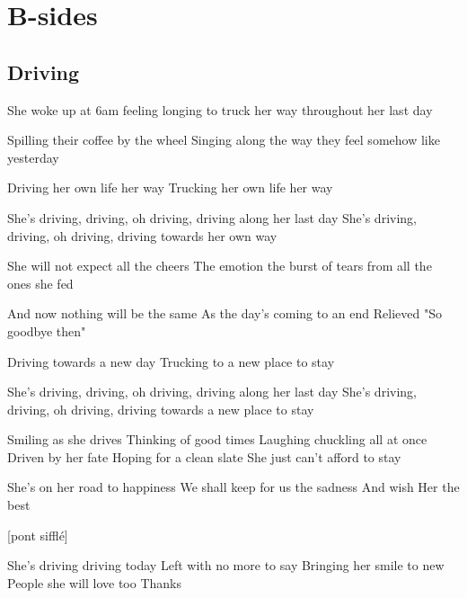 \documentclass{article}
\newenvironment{album}[1]%
{%
  \section*{#1}
}%
{%
}
\newenvironment{song}[1]%
{%
  \subsection*{\textbf{#1}}
  \begin{multicols*}{2}
}%
{%
  \end{multicols*}
  \newpage
}
\newenvironment{couplet} %
{%
  \verbatim
}%
{% end code
  \endverbatim
}
\newenvironment{refrain} %
{%
  \verbatim
}%
{% end code
  \endverbatim
}
\newenvironment{prerefrain} %
{%
  \verbatim
}%
{% end code
  \endverbatim
}
\newenvironment{pont} %
{%
  \verbatim
}%
{% end code
  \endverbatim
}
\begin{document}
\begin{album}{B-sides}
\begin{song}{Driving}
\begin{couplet}
She woke up at 6am
feeling longing to truck her way 
throughout 
her last day
\end{couplet}
\begin{couplet}
Spilling their coffee by the wheel
Singing along the way they feel
somehow 
like yesterday
\end{couplet}
\begin{prerefrain}
Driving her own life  her way
Trucking her own life  her way
\end{prerefrain}
\begin{refrain}
She's driving, driving, oh driving, driving along her last day
She's driving, driving, oh driving, driving towards her own way
\end{refrain}
\begin{couplet}
She will not expect all the cheers
The emotion the burst of tears
from all 
the ones she fed
\end{couplet}
\begin{couplet}
And now nothing will be the same
As the day's coming to an end
Relieved
"So goodbye then"
\end{couplet}
\begin{prerefrain}
Driving towards a new day
Trucking to a new place to stay  
\end{prerefrain}
\begin{refrain}
She's driving, driving, oh driving, driving along her last day
She's driving, driving, oh driving, driving towards a new place to stay
\end{refrain}
\begin{pont}
Smiling as she drives
Thinking of good times
Laughing chuckling all at once
Driven by her fate
Hoping for a clean slate
She just can't afford to stay
\end{pont}
\begin{couplet}
She's on her road to happiness
We shall keep for us the sadness
And wish
Her the best
\end{couplet}

[pont sifflé]

\begin{couplet}
She's driving driving today
Left with no more to say
Bringing her smile to new
People she will love too
Thanks
\end{couplet}

\end{song}


\end{album}
\end{document}
